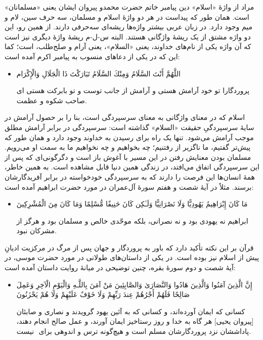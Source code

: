 مراد از واژهٔ «اسلام» دین پیامبر خاتم حضرت محمد{}و پیروان ایشان یعنی «مسلمانان» است. همان طور که پیداست در هر دو واژهٔ‌ اسلام و مسلمان، سه حرف سین، لام و میم وجود دارد. در زبان عربی بیشتر واژه‌ها ریشه‌ای سه‌حرفی دارند. از همین رو، این دو واژه مشتق از یک ریشهٔ واژگانی هستند. البته س-ل-م ریشهٔ واژهٔ دیگری نیز است که آن واژه یکی از نام‌های خداوند، یعنی «السلام»، یعنی آرام و صلح‌طلب، است؛ کما این که در یکی از دعاهای منسوب به پیامبر اکرم{} آمده است:
\begin{itemize}
	\item[]
	{
		اللَّهُمَّ أَنْتَ السَّلَامُ وَمِنْكَ السَّلَامُ تَبَارَكْتَ ذَا الْجَلَالِ وَالْإِكْرَام}
	
	{ پروردگارا تو خود آرامش هستی و آرامش از جانب توست و تو بابرکت هستی ای صاحب شکوه و عظمت.}
\end{itemize}

اسلام که در معنای واژگانی به معنای سرسپردگی است، بنا را بر حصول آرامش در سایهٔ سرسپردگیِ حقیقت «السلام» گذاشته است: سرسپردگی در برابر آرامش مطلق موجب آرامش می‌شود. تنها یک راه برای رسیدن به خداوند وجود دارد و همان طور که پیش‌تر گفتیم، ما ناگزیر از رفتنیم؛ چه بخواهیم و چه نخواهیم ما به سمت او می‌رویم. مسلمان بودن معنایش رفتن در این مسیر با آغوش باز است و دگرگونی‌ای که پس از این سرسپردگی اتفاق می‌افتد، در زندگی همین دنیا قابل مشاهده است. به همین خاطر، همهٔ انسان‌ها این فرصت را دارند که به سرسپردگی خودخواسته در برابر آفریدگارشان برسند. مثلاً در آیهٔ شصت و هفتم سورهٔ آل‌عمران در مورد حضرت ابراهیم{} آمده است:
\begin{itemize}
	\item[]
	{
		مَا كَانَ إِبْرَاهِيمُ يَهُودِيًّا وَلَا نَصْرَانِيًّا وَلَـٰكِن كَانَ حَنِيفًا مُّسْلِمًا وَمَا كَانَ مِنَ الْمُشْرِكِينَ}
	
	{ ابراهیم نه یهودی بود و نه نصرانی، بلکه موحّدی خالص و مسلمان بود و هرگز از مشرکان نبود.}
\end{itemize}

قرآن بر این نکته تأکید دارد که باور به پروردگار و جهان پس از مرگ در مرکزیت ادیانِ پیش از اسلام نیز بوده است. در یکی از داستان‌های طولانی در مورد حضرت موسی{}، در آیهٔ شصت و دوم سورهٔ بقره، چنین توضیحی در میانهٔ روایت داستان آمده است:


\begin{itemize}
	\item[]
	{
		إِنَّ الَّذِينَ آمَنُوا وَالَّذِينَ هَادُوا وَالنَّصَارَىٰ وَالصَّابِئِينَ مَنْ آمَنَ بِاللَّـهِ وَالْيَوْمِ الْآخِرِ وَعَمِلَ صَالِحًا فَلَهُمْ أَجْرُهُمْ عِندَ رَبِّهِمْ وَلَا خَوْفٌ عَلَيْهِمْ وَلَا هُمْ يَحْزَنُونَ}
	
	{
		کسانی که ایمان آورده‌اند، و کسانی که به آئین یهود گرویدند و نصاری و صابئان [پیروان یحیی‌] هر گاه به خدا و روز رستاخیز ایمان آورند، و عمل صالح انجام دهند، پاداششان نزد پروردگارشان مسلم است و هیچ‌گونه ترس و اندوهی برای ‌ نیست.}
\end{itemize}


